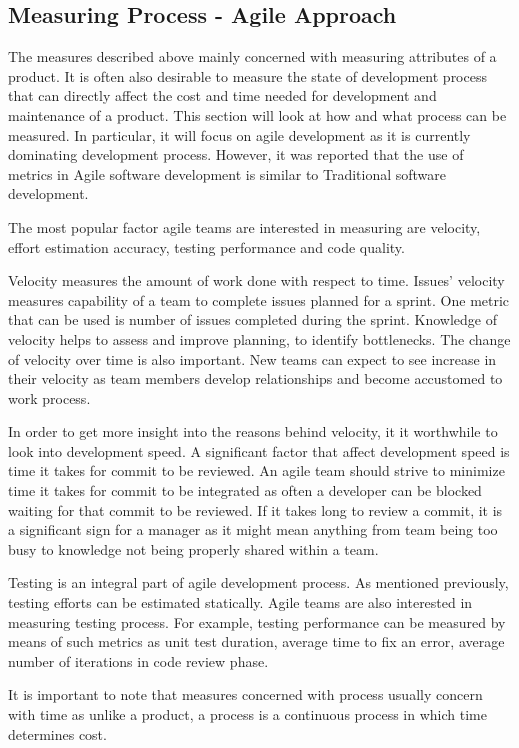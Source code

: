 \documentclass[11pt]{article}
\begin{document}
\subsection{Measuring Process - Agile Approach}
\label{sec:Mesuring-Process}
The measures described above mainly concerned with measuring attributes of a product. It is often also desirable to measure the state of development process that can directly affect the cost and time needed for development and maintenance of a product. This section will look at how and what process can be measured. In particular, it will focus on agile development as it is currently dominating development process. However, it was reported that the use of metrics in Agile software development is similar to Traditional software development.\cite{Kupiainen:2015:UMA:2784072.2784627}
\par 
The most popular factor agile teams are interested in measuring are velocity, effort estimation accuracy, testing performance and code quality.
\par
Velocity measures the amount of work done with respect to time. Issues' velocity measures capability of a team to complete issues planned for a sprint. One metric that can be used is number of issues completed during the sprint. Knowledge of velocity helps to assess and improve planning, to identify bottlenecks.\cite{Agile-case-study-finland} The change of velocity over time is also important. New teams can expect to see increase in their velocity as team members develop relationships and become accustomed to work process.
\par 
In order to get more insight into the reasons behind velocity, it it worthwhile to look into development speed. A significant factor that affect development speed is time it takes for commit to be reviewed. An agile team should strive to minimize time it takes for commit to be integrated as often a developer can be blocked waiting for that commit to be reviewed. If it takes long to review a commit, it is a significant sign for a manager as it might mean anything from team being too busy to knowledge not being properly shared within a team.
\par 
Testing is an integral part of agile development process. As mentioned previously, testing efforts can be estimated statically. Agile teams are also interested in measuring testing process. For example, testing performance can be measured by means of such metrics as unit test duration, average time to fix an error, average number of iterations in code review phase.
\par 
It is important to note that measures concerned with process usually concern with time as unlike a product, a process is a continuous process in which time determines cost.
\end{document}
